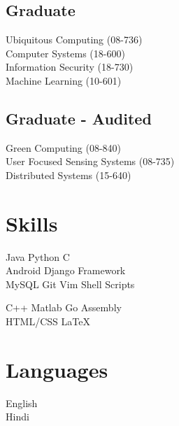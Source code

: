 \documentclass[]{deedy-resume-openfont}
\begin{document}
\begin{minipage}[t]{0.33\textwidth}
\subsection{Graduate}
Ubiquitous Computing (08-736)\\
Computer Systems (18-600)\\
Information Security (18-730)\\
Machine Learning (10-601)\\
\sectionsep

\subsection{Graduate - Audited}
Green Computing (08-840)\\
User Focused Sensing Systems (08-735)\\
Distributed Systems (15-640)\\
\sectionsep



\section{Skills}
Java \textbullet{} Python  \textbullet{} C\\
Android \textbullet{} Django Framework\\
MySQL \textbullet{} Git \textbullet{} Vim \textbullet{} Shell Scripts\\
\sectionsep

C++ \textbullet{} Matlab \textbullet{} Go \textbullet{} Assembly \\
HTML/CSS \textbullet{} \LaTeX\ \\ 

\sectionsep


\section{Languages} 
{English}{}\\
{Hindi}{}\\
\sectionsep



\end{minipage}
\end{document}
